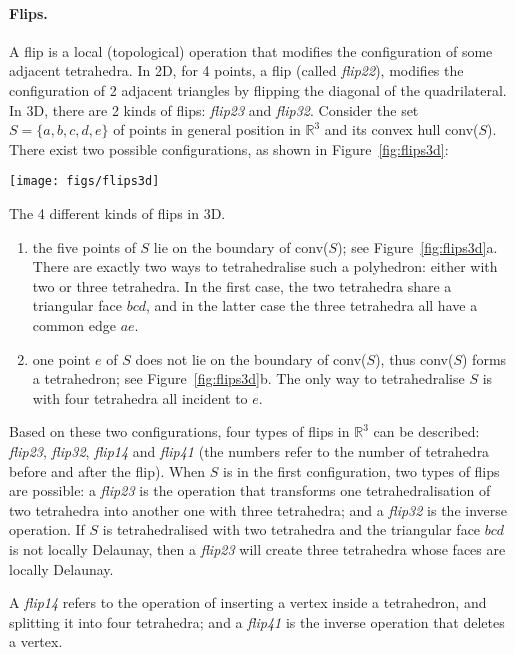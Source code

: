 \paragraph{Flips.}
A flip is a local (topological) operation that modifies the configuration of some adjacent tetrahedra. 
In 2D, for 4 points, a flip (called \emph{flip22}), modifies the configuration of 2 adjacent triangles by flipping the diagonal of the quadrilateral.
In 3D, there are 2 kinds of flips: \emph{flip23} and \emph{flip32}.
Consider the set $S = \{a, b, c, d, e\}$ of points in general position in $\mathbb{R}^{3}$ and its convex hull conv($S$). 
There exist two possible configurations, as shown in Figure~\ref{fig:flips3d}:
\begin{marginfigure}
  \centering
  \texttt{[image: figs/flips3d]}
  \caption{The 4 different kinds of flips in 3D.}%
\label{fig:flips3d}
\end{marginfigure}
\begin{enumerate}
  \item the five points of $S$ lie on the boundary of conv($S$); see Figure~\ref{fig:flips3d}a. There are exactly two ways to tetrahedralise such a polyhedron: either with two or three tetrahedra. In the first case, the two tetrahedra share a triangular face $bcd$, and in the latter case the three tetrahedra all have a common edge $ae$.
  \item one point $e$ of $S$ does not lie on the boundary of conv($S$), thus conv($S$) forms a tetrahedron; see Figure~\ref{fig:flips3d}b. The only way to tetrahedralise $S$ is with four tetrahedra all incident to $e$.
\end{enumerate}
Based on these two configurations, four types of flips in $\mathbb{R}^{3}$ can be described: \emph{flip23}, \emph{flip32}, \emph{flip14} and \emph{flip41} (the numbers refer to the number of tetrahedra before and after the flip). 
When $S$ is in the first configuration, two types of flips are possible: a \emph{flip23} is the operation that transforms one tetrahedralisation of two tetrahedra into another one with three tetrahedra; and a \emph{flip32} is the inverse operation. 
If $S$ is tetrahedralised with two tetrahedra and the triangular face $bcd$ is not locally Delaunay, then a \emph{flip23} will create three tetrahedra whose faces are locally Delaunay. 

A \emph{flip14} refers to the operation of inserting a vertex inside a tetrahedron, and splitting it into four tetrahedra; and a \emph{flip41} is the inverse operation that deletes a vertex.

